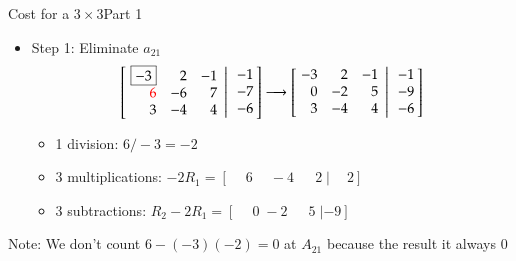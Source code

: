 \documentclass[10pt]{beamer}
\begin{document}
\begin{frame}{Cost for a $3\times 3$}{Part 1}
\begin{itemize}
\item Step 1: Eliminate $a_{21}$
$$
      \left[\left.\negthickspace\begin{array}{rrr}  \boxed{-3} &  2 & -1  \\
                                                    \textcolor{red}{6} & -6 &  7 \\
                                                    3 & -4 &  4 \end{array}
       \right|\begin{array}{r} -1 \\ -7 \\ -6 \end{array}\negthickspace\right]
            \longrightarrow
        \left[\left.\negthickspace\begin{array}{rrr}  -3 &  2 & -1 \\
                                                    0 & -2 &  5 \\
                                                    3 & -4 &  4 \end{array}
           \right|\begin{array}{r} -1 \\ -9 \\ -6 \end{array}\negthickspace\right]
$$
\begin{itemize}
    \item 1 division: $6/-3 = -2$
    \item 3 multiplications: $-2R_1 = [\phantom{-}6 \phantom{-}-4\; \phantom{-}2\; | \phantom{-}2]$  
    \item 3 subtractions: $R_2 - 2 R_1 = [\phantom{-}0\; -2\; \phantom{-}5\; | -9]$ 
\end{itemize}
\end{itemize}
\begin{alertblock}{}
Note: We don't count $6-(-3)(-2)=0$ at $A_{21}$ because the result it always $0$
\end{alertblock}
\end{frame}
\end{document}
